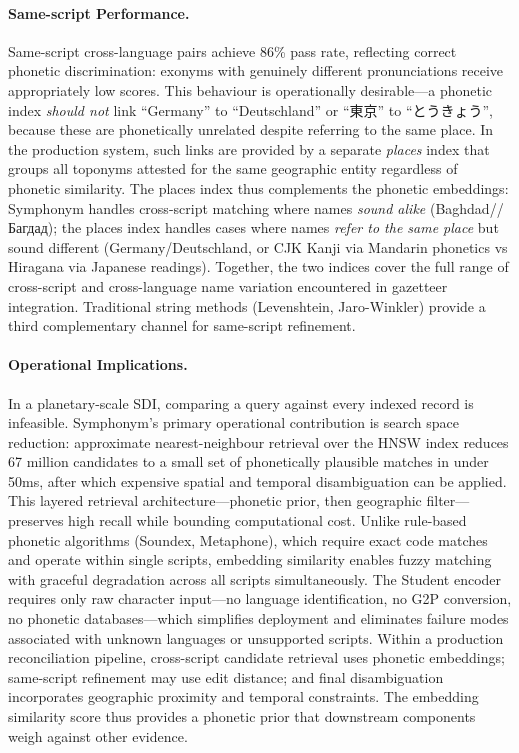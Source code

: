 \documentclass[11pt,a4paper]{article}
\newcommand{\textar}[1]{{\arabicfont\RL{#1}}}
\newcommand{\textcn}[1]{{\chinesefont #1}}
\newcommand{\textjp}[1]{{\chinesefont #1}}
\begin{document}
\paragraph{Same-script Performance.} Same-script cross-language pairs achieve 86\% pass rate, reflecting correct phonetic discrimination: exonyms with genuinely different pronunciations receive appropriately low scores. This behaviour is operationally desirable---a phonetic index \emph{should not} link ``Germany'' to ``Deutschland'' or ``\textcn{東京}'' to ``\textjp{とうきょう}'', because these are phonetically unrelated despite referring to the same place. In the production system, such links are provided by a separate \emph{places} index that groups all toponyms attested for the same geographic entity regardless of phonetic similarity. The places index thus complements the phonetic embeddings: Symphonym handles cross-script matching where names \emph{sound alike} (Baghdad/\textar{بغداد}/Багдад); the places index handles cases where names \emph{refer to the same place} but sound different (Germany/Deutschland, or CJK Kanji via Mandarin phonetics vs Hiragana via Japanese readings). Together, the two indices cover the full range of cross-script and cross-language name variation encountered in gazetteer integration. Traditional string methods (Levenshtein, Jaro-Winkler) provide a third complementary channel for same-script refinement.

\paragraph{Operational Implications.} In a planetary-scale SDI, comparing a query against every indexed record is infeasible. Symphonym's primary operational contribution is search space reduction: approximate nearest-neighbour retrieval over the HNSW index reduces 67 million candidates to a small set of phonetically plausible matches in under 50ms, after which expensive spatial and temporal disambiguation can be applied. This layered retrieval architecture---phonetic prior, then geographic filter---preserves high recall while bounding computational cost. Unlike rule-based phonetic algorithms (Soundex, Metaphone), which require exact code matches and operate within single scripts, embedding similarity enables fuzzy matching with graceful degradation across all scripts simultaneously. The Student encoder requires only raw character input---no language identification, no G2P conversion, no phonetic databases---which simplifies deployment and eliminates failure modes associated with unknown languages or unsupported scripts. Within a production reconciliation pipeline, cross-script candidate retrieval uses phonetic embeddings; same-script refinement may use edit distance; and final disambiguation incorporates geographic proximity and temporal constraints. The embedding similarity score thus provides a phonetic prior that downstream components weigh against other evidence.
\end{document}
